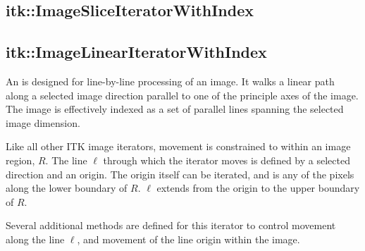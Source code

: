 


\subsection{itk::ImageSliceIteratorWithIndex}
\label{sec:itkImageSliceIteratorWithIndex}

\subsection{itk::ImageLinearIteratorWithIndex}
\label{sec:itkImageLinearIteratorWithIndex}
An  is designed for line-by-line
processing of an image.  It walks a linear path along a selected image
direction parallel to one of the principle axes of the image. The image is
effectively indexed as a set of parallel lines spanning the selected image
dimension.

Like all other ITK image iterators, movement is constrained to within an image
region, $R$.  The line $\ell$ through which the iterator moves is defined by a
selected direction and an origin.  The origin itself can be iterated, and is
any of the pixels along the lower boundary of $R$.  $\ell$ extends from the
origin to the upper boundary of $R$.

Several additional methods are defined for this iterator to control movement
along the line $\ell$, and movement of the line origin within the image.


